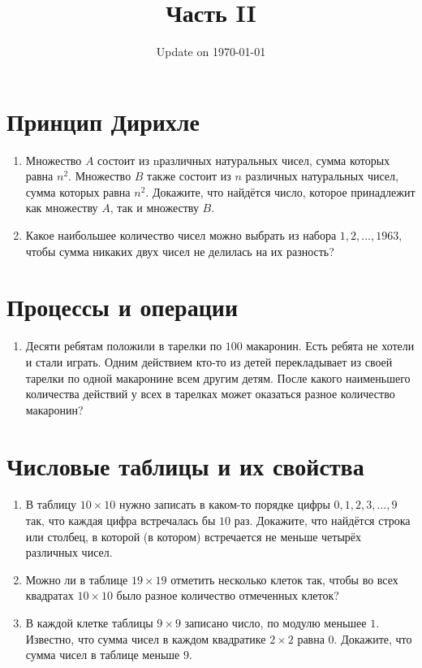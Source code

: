\documentclass[fleqn,oneside]{book}
\begin{document}
\fontsize{12}{12}\selectfont

\title{\bf \huge Часть II}
\date{Update on \today}
\maketitle 


\chapter*{Принцип Дирихле}

\begin{enumerate}
\item Множество $A$ состоит из nразличных натуральных чисел, сумма которых равна $n^{2}$. Множество $B$ также состоит из $n$ различных натуральных чисел, сумма которых равна $n^{2}$. Докажите, что найдётся число, которое принадлежит как множеству $A$, так и множеству $B$.

\item Какое наибольшее количество чисел можно выбрать из набора $1, 2, \dots, 1963$, чтобы сумма никаких двух чисел не делилась на их разность?
\end{enumerate}
 

\chapter*{Процессы и операции}

\begin{enumerate}
\item Десяти ребятам положили в тарелки по $100$ макаронин. Есть ребята не хотели и стали
играть. Одним действием кто-то из детей перекладывает из своей тарелки по одной макаронине всем другим детям. После какого наименьшего количества действий у всех в тарелках может оказаться разное количество макаронин?
\end{enumerate}

\chapter*{Числовые таблицы и их свойства}

\begin{enumerate}
\item В таблицу $10 \times 10$ нужно записать в каком-то порядке цифры  $0, 1, 2, 3, \dots, 9$  так, что каждая цифра встречалась бы $10$ раз. Докажите, что найдётся строка или столбец, в которой (в котором) встречается не меньше четырёх различных чисел. 

\item Можно ли в таблице $19 \times 19$ отметить несколько клеток так, чтобы во всех квадратах $10 \times 10$ было разное количество отмеченных клеток?

\item В каждой клетке таблицы $9 \times 9$ записано число, по модулю меньшее $1$. Известно, что сумма чисел в каждом квадратике $2 \times 2$ равна $0$. Докажите, что сумма чисел в таблице меньше $9$. 
\end{enumerate}
\end{document}
